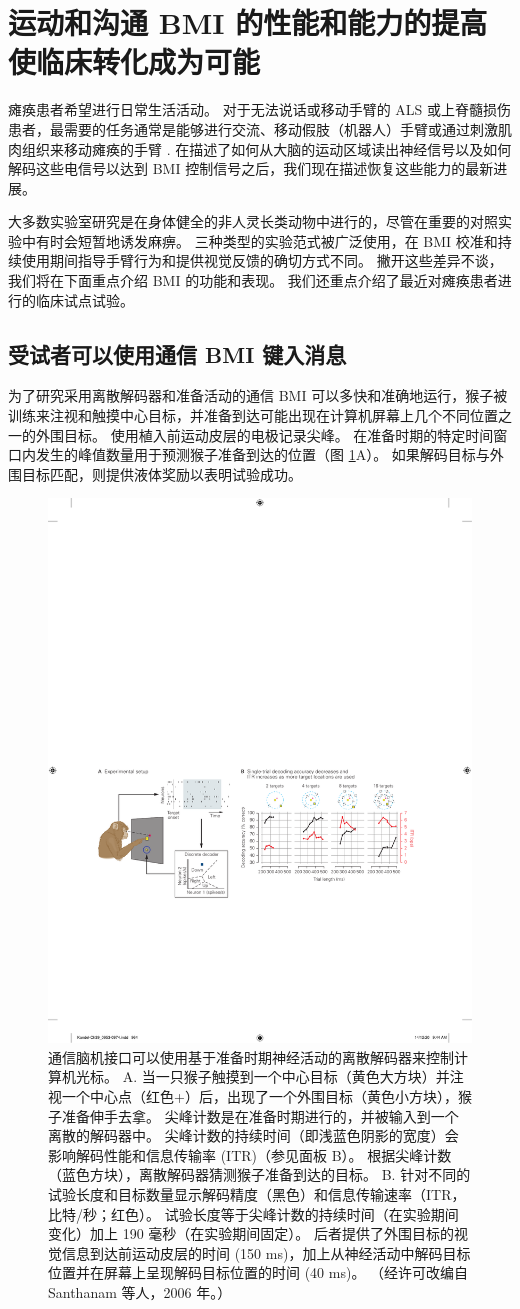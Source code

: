 \section{运动和沟通 BMI 的性能和能力的提高使临床转化成为可能}
瘫痪患者希望进行日常生活活动。 
对于无法说话或移动手臂的 ALS 或上脊髓损伤患者，最需要的任务通常是能够进行交流、移动假肢（机器人）手臂或通过刺激肌肉组织来移动瘫痪的手臂 . 在描述了如何从大脑的运动区域读出神经信号以及如何解码这些电信号以达到 BMI 控制信号之后，我们现在描述恢复这些能力的最新进展。

大多数实验室研究是在身体健全的非人灵长类动物中进行的，尽管在重要的对照实验中有时会短暂地诱发麻痹。 
三种类型的实验范式被广泛使用，在 BMI 校准和持续使用期间指导手臂行为和提供视觉反馈的确切方式不同。 
撇开这些差异不谈，我们将在下面重点介绍 BMI 的功能和表现。 
我们还重点介绍了最近对瘫痪患者进行的临床试点试验。


\subsection{受试者可以使用通信 BMI 键入消息}
为了研究采用离散解码器和准备活动的通信 BMI 可以多快和准确地运行，猴子被训练来注视和触摸中心目标，并准备到达可能出现在计算机屏幕上几个不同位置之一的外围目标。 
使用植入前运动皮层的电极记录尖峰。 
在准备时期的特定时间窗口内发生的峰值数量用于预测猴子准备到达的位置（图 \ref{fig:39_7}A）。 
如果解码目标与外围目标匹配，则提供液体奖励以表明试验成功。

\begin{figure}[htbp]
	\centering
	\includegraphics[width=0.5\linewidth]{chap39/fig_39_7}
	\caption{通信脑机接口可以使用基于准备时期神经活动的离散解码器来控制计算机光标。 
		A. 当一只猴子触摸到一个中心目标（黄色大方块）并注视一个中心点（红色+）后，出现了一个外围目标（黄色小方块），猴子准备伸手去拿。 
		尖峰计数是在准备时期进行的，并被输入到一个离散的解码器中。 
		尖峰计数的持续时间（即浅蓝色阴影的宽度）会影响解码性能和信息传输率 (ITR)（参见面板 B）。 
		根据尖峰计数（蓝色方块），离散解码器猜测猴子准备到达的目标。 
		B. 针对不同的试验长度和目标数量显示解码精度（黑色）和信息传输速率（ITR，比特/秒；红色）。 
		试验长度等于尖峰计数的持续时间（在实验期间变化）加上 190 毫秒（在实验期间固定）。 
		后者提供了外围目标的视觉信息到达前运动皮层的时间 (150 ms)，加上从神经活动中解码目标位置并在屏幕上呈现解码目标位置的时间 (40 ms)。 （经许可改编自 Santhanam 等人，2006 年。）}
	\label{fig:39_7}
\end{figure}

